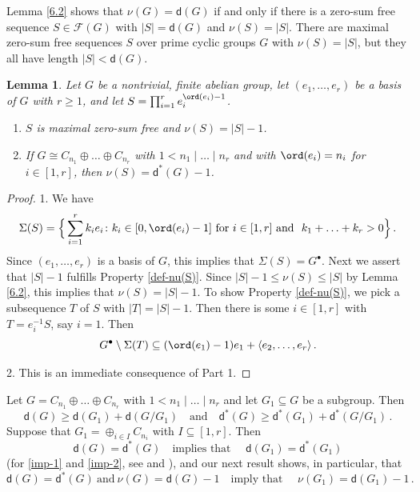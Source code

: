 \documentclass[a4paper, 10pt]{amsart}
\theoremstyle{plain}
\newtheorem{lemma}[theorem]{\bf Lemma}
\theoremstyle{definition}
\numberwithin{equation}{section}
\begin{document}
{Lemma \ref{6.2} shows that $\nu (G) = \mathsf d (G)$ if and only if there is a zero-sum free sequence $S \in \mathcal F (G)$ with $|S|=\mathsf d (G)$ and $\nu (S) = |S|$. There are maximal zero-sum free sequences $S$ over prime cyclic groups $G$ with $\nu (S) = |S|$, but they all have length $|S| < \mathsf d (G)$.



\begin{lemma} \label{6.3}
Let $G$ be a nontrivial, finite abelian group, let $(e_1, \ldots, e_r)$ be a basis of $G$ with $r \ge 1$, and let $S = \prod_{i=1}^r e_i^{\ord (e_i)-1}$.
\begin{enumerate}
\item $S$ is maximal zero-sum free and $\nu (S) = |S|-1$.

\item If $G \cong C_{n_1} \oplus \ldots \oplus C_{n_r}$ with $ 1 < n_1 \mid \ldots \mid n_r$ and with $\ord (e_i)=n_i$ for $i \in [1,r]$, then $\nu (S) = \mathsf d^* (G) - 1$.
\end{enumerate}
\end{lemma}

\begin{proof}
1. We have
\[
\Sigma (S) = \Big\{ \sum_{i=1}^r k_ie_i \colon k_i \in [0, \ord (e_i)-1] \ \text{for $i \in [1,r]$ and } \ k_1+\ldots +k_r > 0 \Big\} \,.
\]
Since $(e_1, \ldots, e_r)$ is a basis of $G$, this implies that $\Sigma (S) = G^{\bullet}$. Next we assert that $|S|-1$ fulfills Property \eqref{def-nu(S)}. Since $|S|-1 \le \nu (S) \le |S|$ by Lemma \ref{6.2}, this implies that $\nu (S) = |S|-1$. To show Property \eqref{def-nu(S)}, we pick a subsequence $T$ of $S$ with $|T|=|S|-1$. Then there is some $i \in [1,r]$ with $T = e_i^{-1}S$, say $i=1$. Then
\[
G^{\bullet} \setminus \Sigma (T) \subseteq  (\ord (e_1)-1)e_1 + \langle e_2, \ldots, e_r \rangle \,.
\]

2. This is an immediate consequence of Part 1.
\end{proof}
 	
\smallskip
Let $G = C_{n_1} \oplus \ldots \oplus C_{n_r}$ with $1 < n_1 \mid \ldots \mid n_r$ and let $G_1 \subseteq G$ be a subgroup. Then
\begin{equation} \label{imp-1}
\mathsf d (G) \ge \mathsf d (G_1) + \mathsf d (G/G_1) \quad \text{and} \quad \mathsf d^* (G) \ge \mathsf d^* (G_1) + \mathsf d^* (G/G_1) \,.
\end{equation}
Suppose that $G_1 = \oplus_{i \in I} C_{n_i}$ with $I \subseteq [1,r]$. Then 
\begin{equation} \label{imp-2}
\mathsf d (G) = \mathsf d^* (G) \quad \text{implies that } \quad \mathsf d (G_1) = \mathsf d^* (G_1)
\end{equation}
(for \eqref{imp-1} and \eqref{imp-2}, see \cite[Lemma 3.2.1]{Ge-HK06a} and \cite[Lemma 4.1]{Gr-Ma-Or09}), and our next result shows, in particular,  that
\[
\mathsf d (G) = \mathsf d^* (G) \ \text{and} \ \nu (G) = \mathsf d (G)-1 \quad \text{imply that } \quad \nu (G_1) = \mathsf d (G_1) - 1 \,.
\]

}
\end{document}
